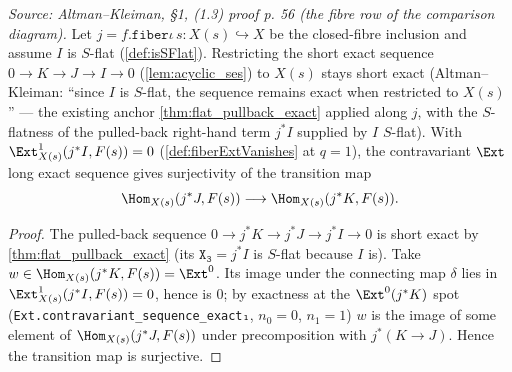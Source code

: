 \begin{lemma}

\leanok
[Fibre-side $\Hom$ surjectivity from $\Ext^1_{X(s)}(I(s),F(s)) = 0$]
  \label{lem:fibre_hom_surjective}
  \textit{Source: Altman--Kleiman, §1, (1.3) proof p. 56 (the fibre row of the
  comparison diagram).}
  Let $j = f.\mathtt{fiber}\iota\,s : X(s) \hookrightarrow X$ be the closed-fibre
  inclusion and assume $I$ is $S$-flat (\cref{def:isSFlat}). Restricting the short
  exact sequence $0 \to K \to J \to I \to 0$ (\cref{lem:acyclic_ses}) to $X(s)$ stays
  short exact (Altman--Kleiman: ``since $I$ is $S$-flat, the sequence remains exact
  when restricted to $X(s)$'' — the existing anchor \cref{thm:flat_pullback_exact}
  applied along $j$, with the $S$-flatness of the pulled-back right-hand term $j^*I$
  supplied by $I$ $S$-flat). With $\Ext^1_{X(s)}(j^*I, F(s)) = 0$
  (\cref{def:fiberExtVanishes} at $q = 1$), the contravariant $\Ext$ long exact
  sequence gives surjectivity of the transition map
  \[
    \Hom_{X(s)}(j^*J, F(s)) \longrightarrow \Hom_{X(s)}(j^*K, F(s)).
  \]
  \begin{proof}
    The pulled-back sequence $0 \to j^*K \to j^*J \to j^*I \to 0$ is short exact by
    \cref{thm:flat_pullback_exact} (its $\mathtt{X_3} = j^*I$ is $S$-flat because $I$
    is). Take $w \in \Hom_{X(s)}(j^*K, F(s)) = \Ext^0$. Its
    image under the connecting map $\delta$ lies in $\Ext^1_{X(s)}(j^*I, F(s)) = 0$,
    hence is $0$; by exactness at the $\Ext^0(j^*K)$ spot
    (\texttt{Ext.contravariant\_sequence\_exact₁}, $n_0 = 0$, $n_1 = 1$) $w$ is the
    image of some element of $\Hom_{X(s)}(j^*J, F(s))$ under precomposition with
    $j^*(K \to J)$. Hence the transition map is surjective.
  \end{proof}
\end{lemma}

